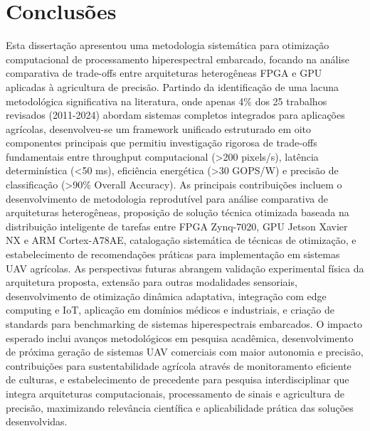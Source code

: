 \chapter{Conclusões}\label{chp:conclusoes}

Esta dissertação apresentou uma metodologia sistemática para otimização computacional de processamento hiperespectral embarcado, focando na análise comparativa de trade-offs entre arquiteturas heterogêneas FPGA e GPU aplicadas à agricultura de precisão. Partindo da identificação de uma lacuna metodológica significativa na literatura, onde apenas 4\% dos 25 trabalhos revisados (2011-2024) abordam sistemas completos integrados para aplicações agrícolas, desenvolveu-se um framework unificado estruturado em oito componentes principais que permitiu investigação rigorosa de trade-offs fundamentais entre throughput computacional (>200 pixels/s), latência determinística (<50 ms), eficiência energética (>30 GOPS/W) e precisão de classificação (>90\% Overall Accuracy). As principais contribuições incluem o desenvolvimento de metodologia reprodutível para análise comparativa de arquiteturas heterogêneas, proposição de solução técnica otimizada baseada na distribuição inteligente de tarefas entre FPGA Zynq-7020, GPU Jetson Xavier NX e ARM Cortex-A78AE, catalogação sistemática de técnicas de otimização, e estabelecimento de recomendações práticas para implementação em sistemas UAV agrícolas. As perspectivas futuras abrangem validação experimental física da arquitetura proposta, extensão para outras modalidades sensoriais, desenvolvimento de otimização dinâmica adaptativa, integração com edge computing e IoT, aplicação em domínios médicos e industriais, e criação de standards para benchmarking de sistemas hiperespectrais embarcados. O impacto esperado inclui avanços metodológicos em pesquisa acadêmica, desenvolvimento de próxima geração de sistemas UAV comerciais com maior autonomia e precisão, contribuições para sustentabilidade agrícola através de monitoramento eficiente de culturas, e estabelecimento de precedente para pesquisa interdisciplinar que integra arquiteturas computacionais, processamento de sinais e agricultura de precisão, maximizando relevância científica e aplicabilidade prática das soluções desenvolvidas.